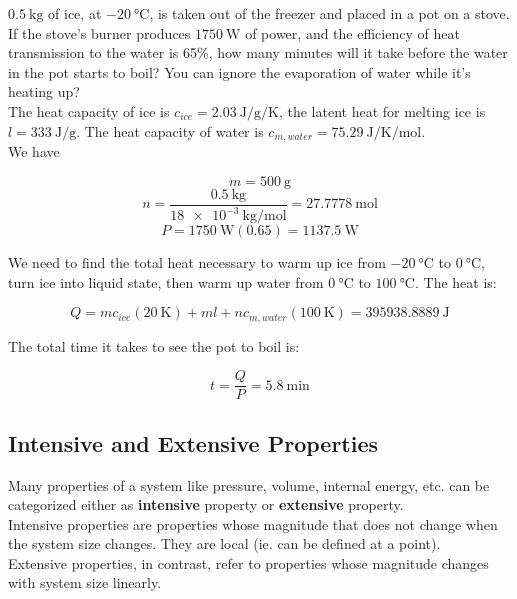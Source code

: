 \begin{texample}
	$\SI{0.5}{\kilo\gram}$ of ice, at $\SI{-20}{\celsius}$, is taken out of the freezer and placed in a pot on a stove. If the stove's burner produces $\SI{1750}{\watt}$ of power, and the efficiency of heat transmission to the water is 65\%, how many minutes will it take before the water in the pot starts to boil? You can ignore the evaporation of water while it's heating up? \\
	
	The heat capacity of ice is $c_{ice}=\SI{2.03}{\joule\per\gram\per\kelvin}$, the latent heat for melting ice is $l=\SI{333}{\joule\per\gram}$. The heat capacity of water is $c_{m,water}=\SI{75.29}{\joule\per\kelvin\per\mole}$. \\
	
	We have
	
	\[m=\SI{500}{\gram}\]
	\[n=\frac{\SI{0.5}{\kilo\gram}}{\SI{18e-3}{\kilo\gram\per\mole}}=\SI{27.7778}{\mole}\]
	\[P=\SI{1750}{\watt} (0.65)=\SI{1137.5}{\watt}\]
	
	We need to find the total heat necessary to warm up ice from $\SI{-20}{\celsius}$ to $\SI{0}{\celsius}$, turn ice into liquid state, then warm up water from $\SI{0}{\celsius}$ to $\SI{100}{\celsius}$. The heat is:
	
	\[Q=mc_{ice}(\SI{20}{\kelvin})+ml+nc_{m,water}(\SI{100}{\kelvin})=\SI{395938.8889}{\joule}\]
	
	The total time it takes to see the pot to boil is:
	
	\[t=\frac{Q}{P}=\SI{5.8}{\minute}\]
\end{texample}

\subsection{Intensive and Extensive Properties}

Many properties of a system like pressure, volume, internal energy, etc. can be categorized either as \textbf{intensive} property or \textbf{extensive} property. \\

Intensive properties are properties whose magnitude that does not change when the system size changes. They are local (ie. can be defined at a point). \\

Extensive properties, in contrast, refer to properties whose magnitude changes with system size linearly. \\

